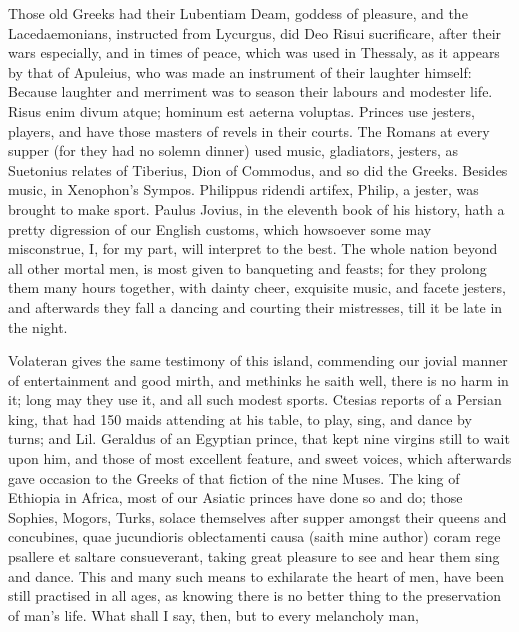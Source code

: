 {Those old Greeks had their Lubentiam Deam, goddess of pleasure,
and the Lacedaemonians, instructed from Lycurgus, did Deo Risui
sucrificare, after their wars especially, and in times of peace, which
was used in Thessaly, as it appears by that of Apuleius, who was
made an instrument of their laughter himself: Because laughter
and merriment was to season their labours and modester life.
Risus enim divum atque; hominum est aeterna voluptas. Princes use
jesters, players, and have those masters of revels in their courts. The
Romans at every supper (for they had no solemn dinner) used music,
gladiators, jesters, \etc{} as Suetonius relates of Tiberius, Dion
of Commodus, and so did the Greeks. Besides music, in Xenophon's
Sympos. Philippus ridendi artifex, Philip, a jester, was brought to
make sport. Paulus Jovius, in the eleventh book of his history, hath a
pretty digression of our English customs, which howsoever some may
misconstrue, I, for my part, will interpret to the best. The
whole nation beyond all other mortal men, is most given to banqueting
and feasts; for they prolong them many hours together, with dainty
cheer, exquisite music, and facete jesters, and afterwards they fall a
dancing and courting their mistresses, till it be late in the night.

Volateran gives the same testimony of this island, commending our
jovial manner of entertainment and good mirth, and methinks he saith
well, there is no harm in it; long may they use it, and all such modest
sports. Ctesias reports of a Persian king, that had 150 maids attending
at his table, to play, sing, and dance by turns; and Lil.
Geraldus of an Egyptian prince, that kept nine virgins still to wait
upon him, and those of most excellent feature, and sweet voices, which
afterwards gave occasion to the Greeks of that fiction of the nine
Muses. The king of Ethiopia in Africa, most of our Asiatic princes have
done so and do; those Sophies, Mogors, Turks, \etc{} solace themselves
after supper amongst their queens and concubines, quae jucundioris
oblectamenti causa (saith mine author) coram rege psallere et
saltare consueverant, taking great pleasure to see and hear them sing
and dance. This and many such means to exhilarate the heart of men,
have been still practised in all ages, as knowing there is no better
thing to the preservation of man's life. What shall I say, then, but to
every melancholy man,

}
